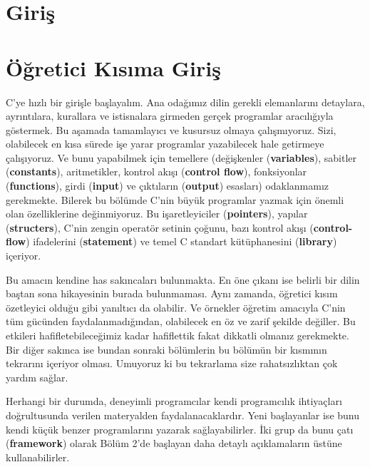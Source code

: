 \documentclass[a4paper,12pt,oneside]{book}
\begin{document}
\noindent \hspace*{270pt}{Brian W. Kernighan \\}
\hspace*{280pt}{Dennis M. Ritchie}

\mainmatter

\chapter*{Giriş}



\chapter{Öğretici Kısıma Giriş}
C'ye hızlı bir girişle başlayalım. Ana odağımız dilin gerekli elemanlarını detaylara, ayrıntılara, kurallara ve istisnalara girmeden gerçek programlar aracılığıyla göstermek. Bu aşamada tamamlayıcı ve kusursuz olmaya çalışmıyoruz. Sizi, olabilecek en kısa sürede işe yarar programlar yazabilecek hale getirmeye çalışıyoruz. Ve bunu yapabilmek için temellere (değişkenler (\textbf{variables}), sabitler (\textbf{constants}), aritmetikler, kontrol akışı (\textbf{control flow}), fonksiyonlar (\textbf{functions}), girdi (\textbf{input}) ve çıktıların (\textbf{output}) esasları) odaklanmamız gerekmekte. Bilerek bu bölümde C'nin büyük programlar yazmak için önemli olan özelliklerine değinmiyoruz. Bu işaretleyiciler (\textbf{pointers}), yapılar (\textbf{structers}), C'nin zengin operatör setinin çoğunu, bazı kontrol akışı (\textbf{control-flow}) ifadelerini (\textbf{statement}) ve temel C standart kütüphanesini (\textbf{library}) içeriyor.
\par Bu amacın kendine has sakıncaları bulunmakta. En öne çıkanı ise belirli bir dilin baştan sona hikayesinin burada bulunmaması. Aynı zamanda, öğretici kısım özetleyici olduğu gibi yanıltıcı da olabilir. Ve örnekler öğretim amacıyla C'nin tüm gücünden faydalanmadığından, olabilecek en öz ve zarif şekilde değiller. Bu etkileri hafifletebileceğimiz kadar hafiflettik fakat dikkatli olmanız gerekmekte. Bir diğer sakınca ise bundan sonraki bölümlerin bu bölümün bir kısmının tekrarını içeriyor olması. Umuyoruz ki bu tekrarlama size rahatsızlıktan çok yardım sağlar.
\par Herhangi bir durumda, deneyimli programcılar kendi programcılık ihtiyaçları doğrultusunda verilen materyalden faydalanacaklardır. Yeni başlayanlar ise bunu kendi küçük benzer programlarını yazarak sağlayabilirler. İki grup da bunu çatı (\textbf{framework}) olarak Bölüm 2'de başlayan daha detaylı açıklamaların üstüne kullanabilirler. \pagebreak
\end{document}
